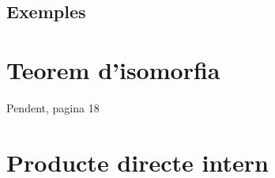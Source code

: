 \documentclass{article}
\begin{document}
\subsection*{Exemples}

\section{Teorem d'isomorfia}
Pendent, pagina 18

\section{Producte directe intern}
\end{document}
